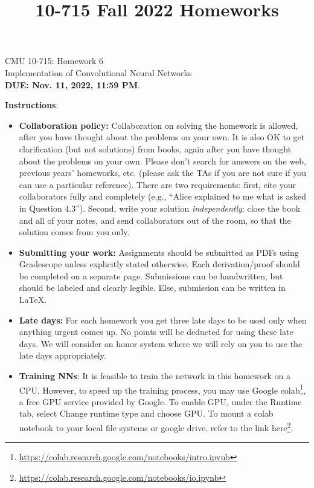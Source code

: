 \documentclass{article}
\title{10-715 Fall 2022 Homeworks}
\begin{document}
\begin{center}
{\Large CMU 10-715: Homework 6}\\
Implementation of Convolutional Neural Networks \\
{\bf DUE: Nov. 11, 2022, 11:59 PM}.\\
\end{center}

\textbf{\large Instructions}:
\begin{itemize}
    \item \textbf{Collaboration policy:} Collaboration on solving the homework is allowed, after you have thought about the problems on your own. It is also OK to get clarification (but not solutions) from books, again after you have thought about the problems on your own. Please don’t search for answers on the web, previous years’ homeworks, etc. (please ask the TAs if you are not sure if you can use a particular reference). There are two requirements: first, cite your collaborators fully and completely (e.g., ``Alice explained to me what is asked in Question 4.3''). Second, write your solution \emph{independently}: close the book and all of your notes, and send collaborators out of the room, so that the solution comes from you only. 
    \item \textbf{Submitting your work:} Assignments should be submitted as PDFs using Gradescope unless explicitly stated otherwise. Each derivation/proof should be completed on a separate page. Submissions can be handwritten, but should be labeled and clearly legible. Else, submission can be written in LaTeX.
    
    \item \textbf{Late days:} For each homework you get three late days to be used only when anything urgent comes up. No points will be deducted for using these late days. We will consider an honor system where we will rely on you to use the late days appropriately.
    
    \item \textbf{Training NNs}: It is feasible to train the network in this homework on a CPU. However, to speed up the training process, you may use Google colab\footnote{\url{https://colab.research.google.com/notebooks/intro.ipynb}}, a free GPU service provided by Google. To enable GPU, under the Runtime tab, select Change runtime type and choose GPU. To mount a colab notebook to your local file systems or google drive, refer to the link here\footnote{\url{https://colab.research.google.com/notebooks/io.ipynb}}.
    

\end{itemize}
\end{document}
